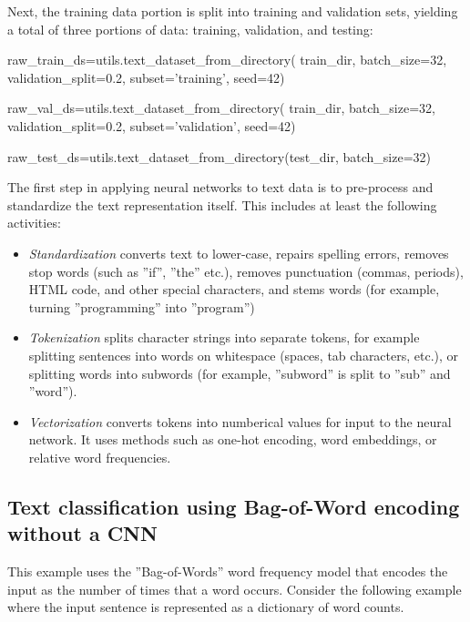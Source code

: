 Next, the training data portion is split into training and validation sets, yielding a total of three portions of data: training, validation, and testing:

\begin{pythoncode}
raw_train_ds=utils.text_dataset_from_directory(
    train_dir, batch_size=32, validation_split=0.2,
    subset='training', seed=42)

raw_val_ds=utils.text_dataset_from_directory(
    train_dir, batch_size=32, validation_split=0.2,
    subset='validation', seed=42)

raw_test_ds=utils.text_dataset_from_directory(test_dir, batch_size=32)
\end{pythoncode}

The first step in applying neural networks to text data is to pre-process and standardize the text representation itself. This includes at least the following activities:

\begin{itemize}
   \item \emph{Standardization} converts text to lower-case, repairs spelling errors, removes stop words (such as ''if'', ''the'' etc.), removes punctuation (commas, periods), HTML code, and other special characters, and stems words (for example, turning ''programming'' into ''program'')
   \item \emph{Tokenization} splits character strings into separate tokens, for example splitting sentences into words on whitespace (spaces, tab characters, etc.), or splitting words into subwords (for example, ''subword'' is split to ''sub'' and ''word'').
   \item \emph{Vectorization} converts tokens into numberical values for input to the neural network. It uses methods such as one-hot encoding, word embeddings, or relative word frequencies.
\end{itemize}

\subsection[Bag-ofWord encoding]{Text classification using Bag-of-Word encoding without a CNN}

This example uses the ''Bag-of-Words''  word frequency model that encodes the input as the number of times that a word occurs. Consider the following example where the input sentence is represented as a dictionary of word counts. 


